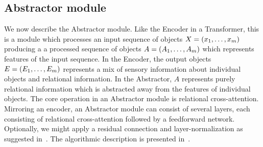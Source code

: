 \subsection{Abstractor module}\label{ssec:abstractor_module}

We now describe the Abstractor module. Like the Encoder in a Transformer, this is a module which processes an input sequence of objects $X = \left(x_1, \ldots, x_m\right)$ producing a a processed sequence of objects $A = \left(A_1, \ldots, A_m\right)$ which represents features of the input sequence. In the Encoder, the output objects $E = \left(E_1, \ldots, E_m\right)$ represents a mix of sensory information about individual objects and relational information. In the Abstractor, $A$ represents purely relational information which is abstracted away from the features of individual objects. The core operation in an Abstractor module is relational cross-attention. Mirroring an encoder, an Abstractor module can consist of several layers, each consisting of relational cross-attention followed by a feedforward network. Optionally, we might apply a residual connection and layer-normalization as suggested in~\citep{vaswani2017attention}. The algorithmic description is presented in~.

